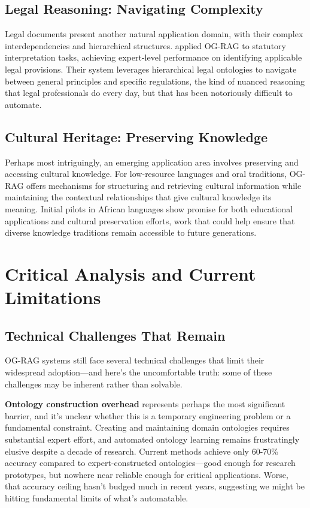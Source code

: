 \subsection{Legal Reasoning: Navigating Complexity}

Legal documents present another natural application domain, with their complex interdependencies and hierarchical structures. \citet{savelka2023ontology} applied OG-RAG to statutory interpretation tasks, achieving expert-level performance on identifying applicable legal provisions. Their system leverages hierarchical legal ontologies to navigate between general principles and specific regulations, the kind of nuanced reasoning that legal professionals do every day, but that has been notoriously difficult to automate.

\subsection{Cultural Heritage: Preserving Knowledge}

Perhaps most intriguingly, an emerging application area involves preserving and accessing cultural knowledge. For low-resource languages and oral traditions, OG-RAG offers mechanisms for structuring and retrieving cultural information while maintaining the contextual relationships that give cultural knowledge its meaning. Initial pilots in African languages show promise for both educational applications and cultural preservation efforts, work that could help ensure that diverse knowledge traditions remain accessible to future generations.

\section{Critical Analysis and Current Limitations}

\subsection{Technical Challenges That Remain}

OG-RAG systems still face several technical challenges that limit their widespread adoption—and here's the uncomfortable truth: some of these challenges may be inherent rather than solvable.

\textbf{Ontology construction overhead} represents perhaps the most significant barrier, and it's unclear whether this is a temporary engineering problem or a fundamental constraint. Creating and maintaining domain ontologies requires substantial expert effort, and automated ontology learning remains frustratingly elusive despite a decade of research. Current methods achieve only 60-70\% accuracy compared to expert-constructed ontologies—good enough for research prototypes, but nowhere near reliable enough for critical applications. Worse, that accuracy ceiling hasn't budged much in recent years, suggesting we might be hitting fundamental limits of what's automatable.

